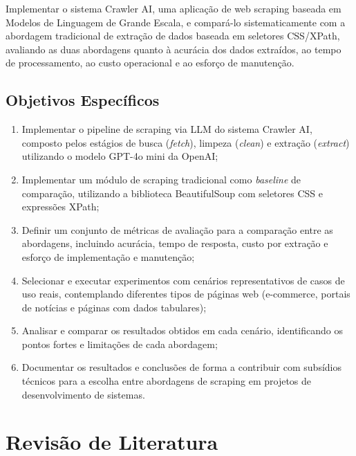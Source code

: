 \documentclass[tcc,capa]{texifsul}
\begin{document}
Implementar o sistema Crawler AI, uma aplicação de web scraping baseada em Modelos de Linguagem de Grande Escala, e compará-lo sistematicamente com a abordagem tradicional de extração de dados baseada em seletores CSS/XPath, avaliando as duas abordagens quanto à acurácia dos dados extraídos, ao tempo de processamento, ao custo operacional e ao esforço de manutenção.

\section{Objetivos Específicos}

\begin{enumerate}
    \item Implementar o pipeline de scraping via LLM do sistema Crawler AI, composto pelos estágios de busca (\textit{fetch}), limpeza (\textit{clean}) e extração (\textit{extract}) utilizando o modelo GPT-4o mini da OpenAI;
    \item Implementar um módulo de scraping tradicional como \textit{baseline} de comparação, utilizando a biblioteca BeautifulSoup com seletores CSS e expressões XPath;
    \item Definir um conjunto de métricas de avaliação para a comparação entre as abordagens, incluindo acurácia, tempo de resposta, custo por extração e esforço de implementação e manutenção;
    \item Selecionar e executar experimentos com cenários representativos de casos de uso reais, contemplando diferentes tipos de páginas web (e-commerce, portais de notícias e páginas com dados tabulares);
    \item Analisar e comparar os resultados obtidos em cada cenário, identificando os pontos fortes e limitações de cada abordagem;
    \item Documentar os resultados e conclusões de forma a contribuir com subsídios técnicos para a escolha entre abordagens de scraping em projetos de desenvolvimento de sistemas.
\end{enumerate}

\chapter{Revisão de Literatura}
\label{cap:revisao}

\end{document}
